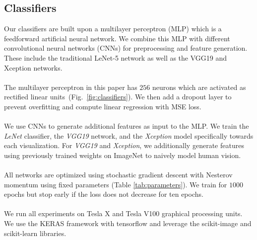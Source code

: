 \subsection{Classifiers}
\label{sec:classifiers}
Our classifiers are built upon a multilayer perceptron (MLP) which is a feedforward artificial neural network. We combine this MLP with different convolutional neural networks (CNNs) for preprocessing and feature generation. These include the traditional LeNet-5 network as well as the VGG19 and Xception networks.
\\~\\
 The multilayer perceptron in this paper has $256$ neurons which are activated as rectified linear units~(Fig.~\ref{fig:classifiers}). We then add a dropout layer to prevent overfitting and compute linear regression with MSE loss.
\\~\\
 We use CNNs to generate additional features as input to the MLP. We train the \emph{LeNet} classifier, the \emph{VGG19} network, and the \emph{Xception} model specifically towards each visualization. For \emph{VGG19} and \emph{Xception}, we additionally generate features using previously trained weights on ImageNet to naively model human vision.
\\~\\
 All networks are optimized using stochastic gradient descent with Nesterov momentum using fixed parameters (Table \ref{tab:parameters}). We train for $1000$ epochs but stop early if the loss does not decrease for ten epochs.
\\~\\
 We run all experiments on Tesla X and Tesla V100 graphical processing units. We use the KERAS framework with tensorflow and leverage the scikit-image and scikit-learn libraries.

